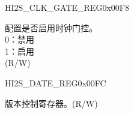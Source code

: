 \begin{register}{H}{I2S\_CLK\_GATE\_REG}{0x00F8}\label{regdesc:I2SCLKGATEREG}
%
%
\regnewline%
\begin{regdesc}\begin{reglist}
\label{fielddesc:I2SCLKEN}\item [I2S\_CLK\_EN] 配置是否启用时钟门控。 \\
0：禁用\\
1：启用\\
(R/W)
\end{reglist}\end{regdesc}
\end{register}


\begin{register}{H}{I2S\_DATE\_REG}{0x00FC}\label{regdesc:I2SDATEREG}
%
%
\regnewline%
\begin{regdesc}\begin{reglist}
\label{fielddesc:I2SDATE}\item [I2S\_DATE] 版本控制寄存器。(R/W)
\end{reglist}\end{regdesc}
\end{register}
